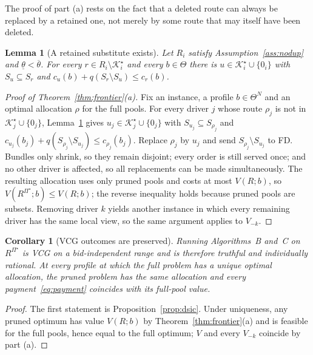 \documentclass[review,12pt]{elsarticle}
\newtheorem{lemma}[theorem]{Lemma}
\newtheorem{corollary}[theorem]{Corollary}
\theoremstyle{definition}
\theoremstyle{remark}
\newcommand{\Kstar}{\mathcal{K}^\star}
\newcommand{\lth}{\underline{\theta}}
\newcommand{\uth}{\overline{\theta}}
\begin{document}
The proof of part (a) rests on the fact that a deleted route can always be
replaced by a retained one, not merely by some route that may itself have
been deleted.

\begin{lemma}[A retained substitute exists]
\label{lem:substitute}
Let $R_i$ satisfy Assumption~\ref{ass:nodup} and $\lth<\uth$. For every
$r\in R_i\setminus\Kstar_i$ and every $b\in\Theta$ there is
$u\in\Kstar_i\cup\{0_i\}$ with $S_u\subseteq S_r$ and
$c_u(b)+q(S_r\setminus S_u)\le c_r(b)$.
\end{lemma}

\begin{proof}[Proof of Theorem~\ref{thm:frontier}(a)]
Fix an instance, a profile $b\in\Theta^N$ and an optimal allocation $\rho$
for the full pools. For every driver $j$ whose route $\rho_j$ is not in
$\Kstar_j\cup\{0_j\}$, Lemma~\ref{lem:substitute} gives
$u_j\in\Kstar_j\cup\{0_j\}$ with $S_{u_j}\subseteq S_{\rho_j}$ and
$c_{u_j}(b_j)+q(S_{\rho_j}\setminus S_{u_j})\le c_{\rho_j}(b_j)$. Replace
$\rho_j$ by $u_j$ and send $S_{\rho_j}\setminus S_{u_j}$ to FD. Bundles only
shrink, so they remain disjoint; every order is still served once; and no
other driver is affected, so all replacements can be made simultaneously.
The resulting allocation uses only pruned pools and costs at most
$V(R;b)$, so $V(R^{\Pi^\star};b)\le V(R;b)$; the reverse inequality holds
because pruned pools are subsets. Removing driver $k$ yields another
instance in which every remaining driver has the same local view, so the
same argument applies to $V_{-k}$.
\end{proof}

\begin{corollary}[VCG outcomes are preserved]
\label{cor:vcg}
Running Algorithms~B and~C on $R^{\Pi^\star}$ is VCG on a bid-independent
range and is therefore truthful and individually rational. At every
profile at which the full problem has a unique optimal allocation, the
pruned problem has the same allocation and every payment~\eqref{eq:payment}
coincides with its full-pool value.
\end{corollary}

\begin{proof}
The first statement is Proposition~\ref{prop:dsic}. Under uniqueness, any
pruned optimum has value $V(R;b)$ by Theorem~\ref{thm:frontier}(a) and is
feasible for the full pools, hence equal to the full optimum; $V$ and every
$V_{-k}$ coincide by part (a).
\end{proof}
\end{document}
